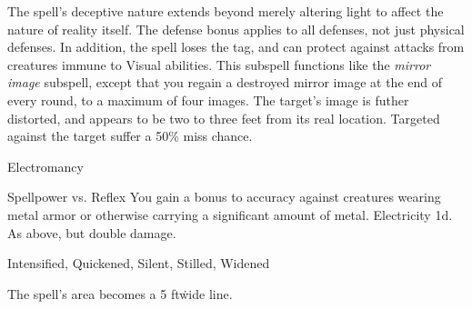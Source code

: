 The spell's deceptive nature extends beyond merely altering light to affect the nature of reality itself.
The defense bonus applies to all defenses, not just physical defenses.
In addition, the spell loses the  tag, and can protect against attacks from creatures immune to Visual abilities.
This subspell functions like the \textit{mirror image} subspell, except that you regain a destroyed mirror image at the end of every round, to a maximum of four images.
The target's image is futher distorted, and appears to be two to three feet from its real location.
Targeted  against the target suffer a 50\% miss chance.
\begin{spellsection}{Electromancy}
\begin{spellheader}
\end{spellheader}
\begin{spellcontent}
\begin{spelltargetinginfo}
\end{spelltargetinginfo}
\begin{spelleffects}
\begin{spellattack}{Spellpower vs. Reflex}
\spellspecial You gain a  bonus to accuracy against creatures wearing metal armor or otherwise carrying a significant amount of metal.
\spellsuccess
Electricity  \minus1d.
\spellcritical As above, but double damage.
\end{spellattack}
\end{spelleffects}
\end{spellcontent}
\begin{spellfooter}
 Intensified, Quickened, Silent, Stilled, Widened
\end{spellfooter}
\begin{spellsubcontent}
\begin{spellcantrip}
The spell's area becomes a 5 ft\. wide \areamed line.
\end{spellcantrip}
\end{spellsubcontent}
\end{spellsection}
